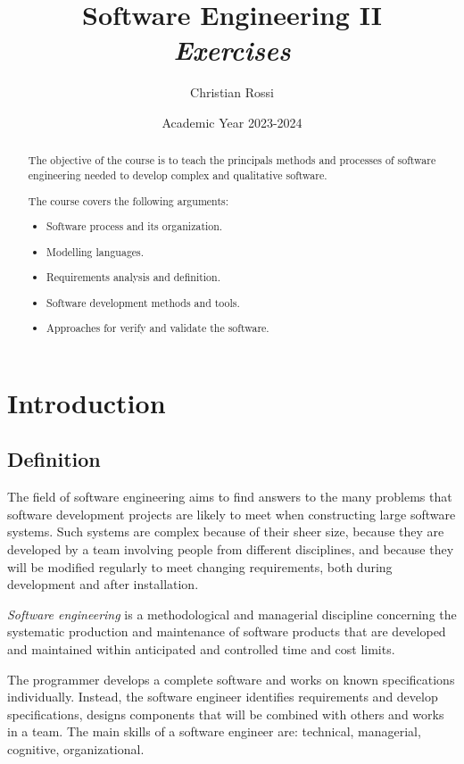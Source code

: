 \documentclass[12pt, a4paper]{report}
\title{Software Engineering II \\ \textit{Exercises}}
\author{Christian Rossi}
\date{Academic Year 2023-2024}
\newtheorem[style=M,bodystyle=\normalfont]{theorem}{Theorem}
\newtheorem[style=M,bodystyle=\normalfont]{corollary}{Corollary}
\newtheorem[style=M,bodystyle=\normalfont]{lemma}{Lemma}
\newtheorem[style=M,bodystyle=\normalfont]{definition}{Definition}
\begin{document}
\maketitle

\newpage

\begin{abstract}
    The objective of the course is to teach the principals methods and processes of software engineering needed to develop complex and qualitative software.
    \par
    The course covers the following arguments:
    \begin{itemize}
        \item Software process and its organization.
        \item Modelling languages.
        \item Requirements analysis and definition.
        \item Software development methods and tools.
        \item Approaches for verify and validate the software.
    \end{itemize}
\end{abstract}

\newpage

\tableofcontents

\newpage

\chapter{Introduction}
\section{Definition}
    The field of software engineering aims to find answers to the many problems that software development projects are likely
    to meet when constructing large software systems. Such systems are complex because of their sheer size, because they are 
    developed by a team involving people from different disciplines, and because they will be modified regularly to meet 
    changing requirements, both during development and after installation. 
    \begin{definition}
        \emph{Software engineering} is a methodological and managerial discipline concerning the systematic production and 
        maintenance of software products that are developed and maintained within anticipated and controlled time and cost limits.
    \end{definition}
    \par
    The programmer develops a complete software and works on known specifications individually. Instead, the software engineer 
    identifies requirements and develop specifications, designs components that will be combined with others and works in a team.
    The main skills of a software engineer are: technical, managerial, cognitive, organizational.
\end{document}
